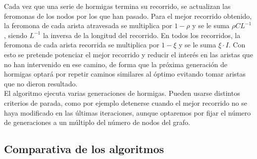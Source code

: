 Cada vez que una serie de hormigas termina su recorrido, se actualizan las feromonas de los nodos por los que han pasado. Para el mejor recorrido obtenido, la feromona de cada arista atravesada se multiplica por $1-\rho$ y se le suma $\rho C L^{-1}$, siendo $L^{-1}$ la inversa de la longitud del recorrido. En todos los recorridos, la feromona de cada arista recorrida se multiplica por $1-\xi$ y se le suma $\xi \cdot I$. Con esto se pretende potenciar el mejor recorrido y reducir el interés en las aristas que no han intervenido en ese camino, de forma que la próxima generación de hormigas optará por repetir caminos similares al óptimo evitando tomar aristas que no dieron resultado. \\

El algoritmo ejecuta varias generaciones de hormigas. Pueden usarse distintos criterios de parada, como por ejemplo detenerse cuando el mejor recorrido no se haya modificado en las últimas iteraciones, aunque optaremos por fijar el número de generaciones a un múltiplo del número de nodos del grafo.

\subsection{Comparativa de los algoritmos}
